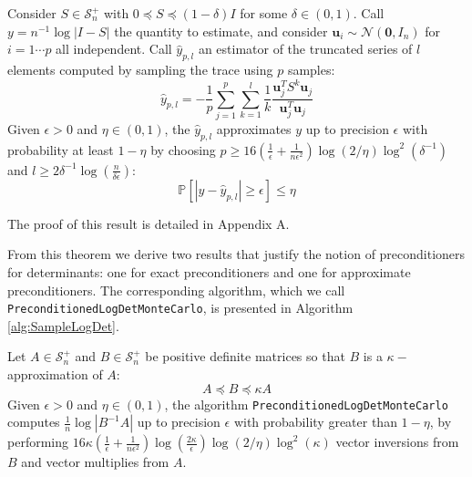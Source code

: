 \begin{theorem}
\label{thm:det-sampling-theorem}Consider $S\in\mathcal{S}_{n}^{+}$
with $0\preceq S\preceq\left(1-\delta\right)I$ for some $\delta\in\left(0,1\right)$.
Call $y=n^{-1}\log\left|I-S\right|$ the quantity to estimate, and
consider $\mathbf{u}_{i}\sim\mathcal{N}\left(\mathbf{0},I_{n}\right)$
for $i=1\cdots p$ all independent. Call $\hat{y}_{p,l}$ an estimator
of the truncated series of $l$ elements computed by sampling the
trace using $p$ samples: 
\[
\hat{y}_{p,l}=-\frac{1}{p}\sum_{j=1}^{p}\sum_{k=1}^{l}\frac{1}{k}\frac{\mathbf{u}_{j}^{T}S^{k}\mathbf{u}_{j}}{\mathbf{u}_{j}^{T}\mathbf{u}_{j}}
\]
Given $\epsilon>0$ and $\eta\in\left(0,1\right)$, the $\hat{y}_{p,l}$
approximates $y$ up to precision $\epsilon$ with probability at
least $1-\eta$ by choosing $p\geq16\left(\frac{1}{\epsilon}+\frac{1}{n\epsilon^{2}}\right)\log\left(2/\eta\right)\log^{2}\left(\delta^{-1}\right)$
and $l\geq2\delta^{-1}\log\left(\frac{n}{\delta\epsilon}\right)$:
\[
\mathbb{P}\left[\left|y-\hat{y}_{p,l}\right|\geq\epsilon\right]\leq\eta
\]

\end{theorem}
The proof of this result is detailed in Appendix A.

From this theorem we derive two results that justify the notion of
preconditioners for determinants: one for exact preconditioners and
one for approximate preconditioners. The corresponding algorithm,
which we call \texttt{Precond\-itioned\-LogDetMonteCarlo}, is presented
in Algorithm \ref{alg:SampleLogDet}. 
\begin{corollary}
\label{cor:preconditioning}Let $A\in\mathcal{S}_{n}^{+}$ and $B\in\mathcal{S}_{n}^{+}$
be positive definite matrices so that $B$ is a $\kappa-$approximation
of $A$: 
\begin{equation}
A\preceq B\preceq\kappa A\label{eq:A-B-bounds}
\end{equation}
Given $\epsilon>0$ and $\eta\in\left(0,1\right)$, the algorithm
\texttt{PreconditionedLogDetMonteCarlo} computes $\frac{1}{n}\log\left|B^{-1}A\right|$
up to precision $\epsilon$ with probability greater than $1-\eta$,
by performing $16\kappa\left(\frac{1}{\epsilon}+\frac{1}{n\epsilon^{2}}\right)\log\left(\frac{2\kappa}{\epsilon}\right)\log\left(2/\eta\right)\log^{2}\left(\kappa\right)$
vector inversions from $B$ and vector multiplies from $A$. 
\end{corollary}

